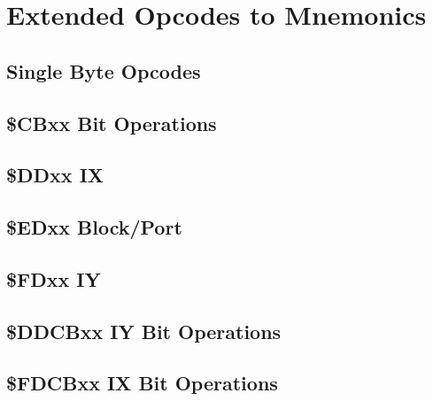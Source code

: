 \chapter{Extended Opcodes to Mnemonics}
\section{Single Byte Opcodes}
\section{\$CBxx Bit Operations}
\section{\$DDxx IX}
\section{\$EDxx Block/Port}
\section{\$FDxx IY}
\section{\$DDCBxx IY Bit Operations}
\section{\$FDCBxx IX Bit Operations}

